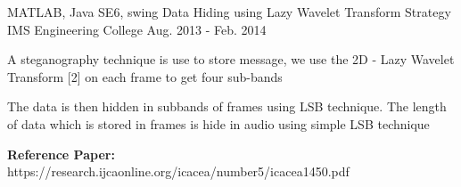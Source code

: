 

\begin{cventries}
		
	\cventry
	{MATLAB, Java SE6, swing} %
	{Data Hiding using Lazy Wavelet Transform Strategy} %
	{IMS Engineering College} %
	{Aug. 2013 - Feb. 2014 } %
	{
		\begin{cvitems} %
			\item {A steganography technique is use to store message, we use the 2D - Lazy Wavelet Transform [2] on each frame to get four sub-bands}
			\item {The data is then hidden in subbands of frames using LSB technique. The length of data which is stored in frames is hide in audio using simple LSB technique}
			\item { \textbf{Reference Paper:} https://research.ijcaonline.org/icacea/number5/icacea1450.pdf }
		\end{cvitems}
	}
\end{cventries}
